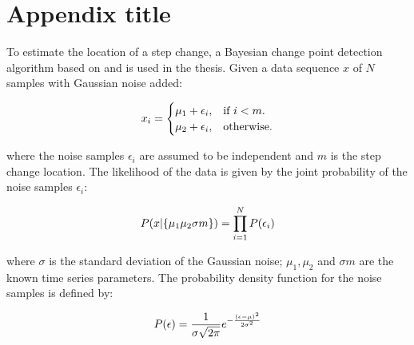 \chapter{Appendix title}
\label{appendix:appendix_1} 


\lipsum[2-4]

To estimate the location of a step change, a Bayesian change point detection algorithm based on \cite{Ruanaidh1996} and \cite{adams2007bayesian} is used in the thesis. Given a data sequence $x$ of $N$ samples with Gaussian noise added:

\begin{equation}
    \centering
      x_i=\begin{cases}
          \mu_1 + \epsilon_i, & \text{if $i<m$}.\\
          \mu_2 + \epsilon_i, & \text{otherwise}.
          \end{cases}
    \label{eq:app:cp:5.1}
\end{equation}

where the noise samples $\epsilon_i$ are assumed to be independent and $m$ is the step change location. The likelihood of the data is given by the joint probability of the noise samples $\epsilon_i$: 

\begin{equation}
    \centering
    P(x|\{\mu_1\mu_2\sigma m\}) = \prod\limits_{i=1}^N P(\epsilon_i)
    \label{eq:app:cp:5.2}
\end{equation}

where $\sigma$ is the standard deviation of the Gaussian noise;  $\mu_1, \mu_2$ and $\sigma m$ are the known time series parameters. The probability density function for the noise samples is defined by:

\begin{equation}
    \centering
    P(\epsilon) = \frac{1}{\sigma \sqrt{2 \pi} }  e ^{ - \frac{ (\epsilon - \mu)^2 } {2\sigma^2} }
    \label{eq:app:cp:noise_pdf}
\end{equation}

\lipsum[2-4]